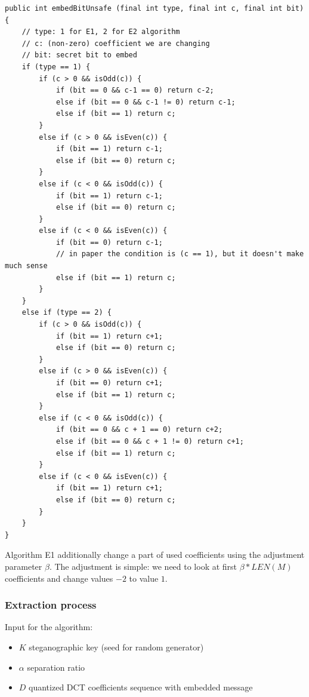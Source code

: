 \begin{lstlisting}
public int embedBitUnsafe (final int type, final int c, final int bit) {
    // type: 1 for E1, 2 for E2 algorithm
    // c: (non-zero) coefficient we are changing
    // bit: secret bit to embed
    if (type == 1) {
        if (c > 0 && isOdd(c)) {
            if (bit == 0 && c-1 == 0) return c-2;
            else if (bit == 0 && c-1 != 0) return c-1;
            else if (bit == 1) return c;
        }
        else if (c > 0 && isEven(c)) {
            if (bit == 1) return c-1;
            else if (bit == 0) return c;
        }
        else if (c < 0 && isOdd(c)) {
            if (bit == 1) return c-1;
            else if (bit == 0) return c;
        }
        else if (c < 0 && isEven(c)) {
            if (bit == 0) return c-1;
            // in paper the condition is (c == 1), but it doesn't make much sense
            else if (bit == 1) return c;
        }
    }
    else if (type == 2) {
        if (c > 0 && isOdd(c)) {
            if (bit == 1) return c+1;
            else if (bit == 0) return c;
        }
        else if (c > 0 && isEven(c)) {
            if (bit == 0) return c+1;
            else if (bit == 1) return c;
        }
        else if (c < 0 && isOdd(c)) {
            if (bit == 0 && c + 1 == 0) return c+2;
            else if (bit == 0 && c + 1 != 0) return c+1;
            else if (bit == 1) return c;
        }
        else if (c < 0 && isEven(c)) {
            if (bit == 1) return c+1;
            else if (bit == 0) return c;
        }
    }
}
\end{lstlisting}

Algorithm E1 additionally change a part of used coefficients using the adjustment
parameter $\beta$. The adjustment is simple: we need to look at first $\beta * LEN(M)$ coefficients and
change values $-2$ to value $1$.

\subsubsection{Extraction process}
Input for the algorithm:

\begin{itemize}
    \item $K$ steganographic key (seed for random generator)
    \item $\alpha$ separation ratio
    \item $D$ quantized DCT coefficients sequence with embedded message
\end{itemize}

